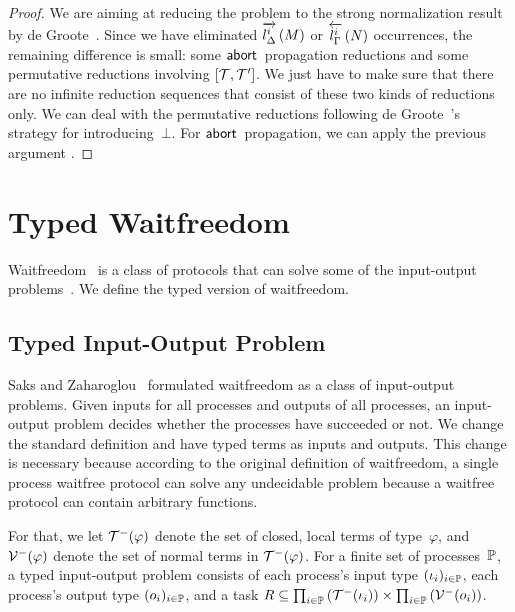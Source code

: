 {\begin{proof}
We are aiming at reducing the problem to the strong normalization result
by de Groote~\cite{Philippe2002js}.
Since we have eliminated $\ltor i l \Delta M$ or $\rtol i l\Gamma N$ occurrences,
the remaining difference is small: some $\abort$ propagation reductions
 and some permutative reductions involving $\cotuple{\term,\term'}$.
We just have to make sure that there are no infinite reduction sequences
that consist of these two kinds of reductions only.
We can deal with the permutative reductions following de
 Groote~\cite{Philippe2002js}'s strategy for introducing~$\bot$.
For $\abort$ propagation, we can apply the previous argument .
\end{proof}

\section{Typed Waitfreedom}
\label{waitfreedom}

Waitfreedom~\cite{Herlihy88,Saks:1993vq} is a class of protocols
that can solve
some of the input-output problems~\cite{Moran:1987ep,Biran:1988hh}.
We define the typed version of waitfreedom.

\subsection{Typed Input-Output Problem}

Saks and Zaharoglou~\cite{Saks:1993vq} formulated waitfreedom as a class
of input-output
problems.
Given inputs for all processes and outputs of all
processes, an input-output problem decides whether the processes have
succeeded or not.
We change the standard definition and have typed terms as inputs and
outputs.
This change is necessary because according to the original definition of
waitfreedom,
a single process waitfree protocol can solve any undecidable problem
because a waitfree protocol can contain arbitrary functions.

For that, we let $\lterm(\varphi)$ denote the set of closed, local terms of
type~$\varphi$,
and $\lval(\varphi)$ denote the set of normal terms in $\lterm(\varphi)$.
For a finite set of processes~$\processes$,
a typed input-output problem consists of each process's input type
$(\iota_i)_{i\in \processes}$, each process's output type $(o_i)_{i\in
\processes}$, and a
task $R\subseteq \prod_{i\in \processes}\left(\lterm(\iota_i)\right)\times
 \prod_{i\in \processes}\left(\lval(o_i)\right)$.

}
